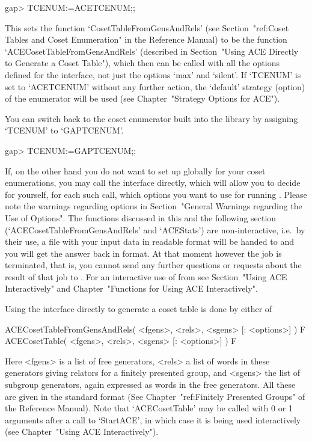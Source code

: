 \begintt
gap> TCENUM:=ACETCENUM;;
\endtt

This    sets    the    function    `CosetTableFromGensAndRels'    (see
Section~"ref:Coset  Tables  and  Coset  Enumeration"  in  the   {\GAP}
Reference Manual) to be  the  function  `ACECosetTableFromGensAndRels'
(described in Section~"Using ACE Directly to Generate a Coset Table"),
which then can be called with all the options defined for  the  {\ACE}
interface, not just the options `max' and `silent'. If `TCENUM' is set
to `ACETCENUM' without any  further  action,  the  `default'  strategy
(option) of the {\ACE} enumerator will be used (see  Chapter~"Strategy
Options for ACE").

You can switch back to the coset  enumerator  built  into  the  {\GAP}
library by assigning `TCENUM' to `GAPTCENUM'.

\begintt
gap> TCENUM:=GAPTCENUM;;
\endtt


If, on the other hand you do not want to set up  {\ACE}  globally  for
your coset enumerations, you may call the {\ACE}  interface  directly,
which will allow you to decide for yourself, for each such call, which
options you want to use for running {\ACE}. Please note  the  warnings
regarding options in Section~"General Warnings regarding  the  Use  of
Options". The functions discussed in this and  the  following  section
(`ACECosetTableFromGensAndRels' and `ACEStats')  are  non-interactive,
i.e.~by their use, a file with your  input  data  in  {\ACE}  readable
format will be handed to {\ACE} and you will get the  answer  back  in
{\GAP} format. At that moment however the {\ACE}  job  is  terminated,
that is, you cannot send any further questions or requests  about  the
result of that job to {\ACE}. For an interactive use  of  {\ACE}  from
{\GAP} see Section~"Using ACE  Interactively"  and  Chapter~"Functions
for Using ACE Interactively".

Using the {\ACE} interface directly to generate a coset table is  done
by either of

\>ACECosetTableFromGensAndRels( <fgens>, <rels>, <sgens> [: <options>] ) F
\>ACECosetTable( <fgens>, <rels>, <sgens> [: <options>] ) F

Here <fgens> is a list of free generators, <rels> a list of  words  in
these generators giving relators for a finitely presented  group,  and
<sgens> the list of subgroup generators, again expressed as  words  in
the free generators. All these are given in the standard {\GAP} format
(See Chapter~"ref:Finitely Presented Groups" of the  {\GAP}  Reference
Manual). Note that `ACECosetTable' may be called with 0 or 1 arguments
after  a  call  to  `StartACE',  in  which  case  it  is  being   used
interactively (see Chapter~"Using ACE Interactively").

